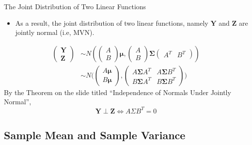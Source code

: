 \documentclass[
  ignorenonframetext,
]{beamer}
\providecommand{\tightlist}{%
  \setlength{\itemsep}{0pt}\setlength{\parskip}{0pt}}
\begin{document}
\begin{frame}{The Joint Distribution of Two Linear Functions}
\protect\hypertarget{the-joint-distribution-of-two-linear-functions-1}{}
\begin{itemize}
\tightlist
\item
  As a result, the joint distribution of two linear functions, namely
  \(\mathbf Y\) and \(\mathbf Z\) are jointly normal (i.e, MVN).
\end{itemize}

\[
\begin{aligned}
\begin{pmatrix}\mathbf Y \\ \mathbf Z\end{pmatrix}
& \sim N(\begin{pmatrix}A \\ B\end{pmatrix}\boldsymbol \mu, \begin{pmatrix}A \\ B\end{pmatrix}\boldsymbol \Sigma \begin{pmatrix}A^T & B^T\end{pmatrix})\\
&\sim N(\begin{pmatrix}A \boldsymbol \mu \\ B\boldsymbol \mu \end{pmatrix}, \begin{pmatrix}A \boldsymbol \Sigma A^T & A \boldsymbol \Sigma B^T\\ B \boldsymbol \Sigma A^T & B \boldsymbol \Sigma B^T \end{pmatrix}\boldsymbol)
\end{aligned} 
\] By the Theorem on the slide titled ``Independence of Normals Under
Jointly Normal'',
\[\mathbf Y \perp \mathbf Z \Leftrightarrow A\Sigma B^T=0\]
\end{frame}

\hypertarget{sample-mean-and-sample-variance}{%
\subsection{Sample Mean and Sample
Variance}\label{sample-mean-and-sample-variance}}
\end{document}
